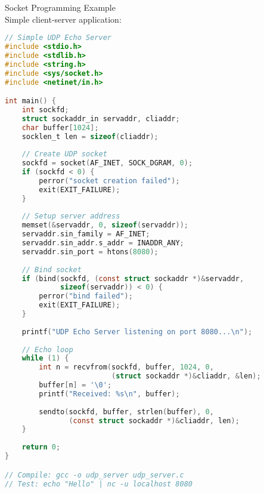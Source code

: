\begin{example2}{Socket Programming Example}\\
    Simple client-server application:
    
\begin{lstlisting}[language=C, style=basesmol]
// Simple UDP Echo Server
#include <stdio.h>
#include <stdlib.h>
#include <string.h>
#include <sys/socket.h>
#include <netinet/in.h>

int main() {
    int sockfd;
    struct sockaddr_in servaddr, cliaddr;
    char buffer[1024];
    socklen_t len = sizeof(cliaddr);
    
    // Create UDP socket
    sockfd = socket(AF_INET, SOCK_DGRAM, 0);
    if (sockfd < 0) {
        perror("socket creation failed");
        exit(EXIT_FAILURE);
    }
    
    // Setup server address
    memset(&servaddr, 0, sizeof(servaddr));
    servaddr.sin_family = AF_INET;
    servaddr.sin_addr.s_addr = INADDR_ANY;
    servaddr.sin_port = htons(8080);
    
    // Bind socket
    if (bind(sockfd, (const struct sockaddr *)&servaddr, 
             sizeof(servaddr)) < 0) {
        perror("bind failed");
        exit(EXIT_FAILURE);
    }
    
    printf("UDP Echo Server listening on port 8080...\n");
    
    // Echo loop
    while (1) {
        int n = recvfrom(sockfd, buffer, 1024, 0, 
                         (struct sockaddr *)&cliaddr, &len);
        buffer[n] = '\0';
        printf("Received: %s\n", buffer);
        
        sendto(sockfd, buffer, strlen(buffer), 0, 
               (const struct sockaddr *)&cliaddr, len);
    }
    
    return 0;
}

// Compile: gcc -o udp_server udp_server.c
// Test: echo "Hello" | nc -u localhost 8080
\end{lstlisting}
\end{example2}

